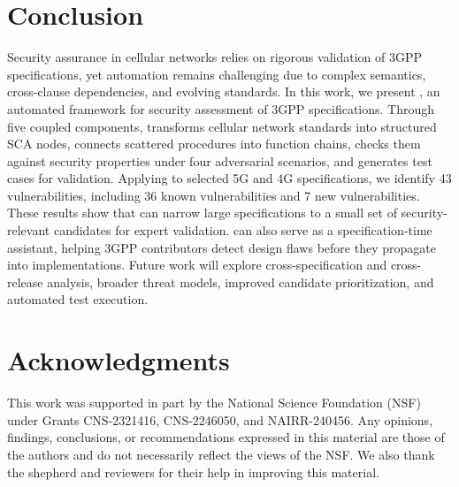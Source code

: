 

\section{Conclusion}
\noindent Security assurance in cellular networks relies on rigorous validation of 3GPP specifications, yet automation remains challenging due to complex semantics, cross-clause dependencies, and evolving standards. In this work, we present \lm, an automated framework for security assessment of 3GPP specifications. Through five coupled components, \lm transforms cellular network standards into structured SCA nodes, connects scattered procedures into function chains, checks them against security properties under four adversarial scenarios, and generates test cases for validation. Applying \lm to selected 5G and 4G specifications, we identify 43 vulnerabilities, including 36 known vulnerabilities and 7 new vulnerabilities. These results show that \lm can narrow large specifications to a small set of security-relevant candidates for expert validation. \lm can also serve as a specification-time assistant, helping 3GPP contributors detect design flaws before they propagate into implementations. Future work will explore cross-specification and cross-release analysis, broader threat models, improved candidate prioritization, and automated test execution.

\section{Acknowledgments}
This work was supported in part by the National Science Foundation (NSF) under Grants CNS-2321416, CNS-2246050, and NAIRR-240456. Any opinions, findings, conclusions, or recommendations expressed in this material are those of the authors and do not necessarily reflect the views of the NSF. We also thank the shepherd and reviewers for their help in improving this material.